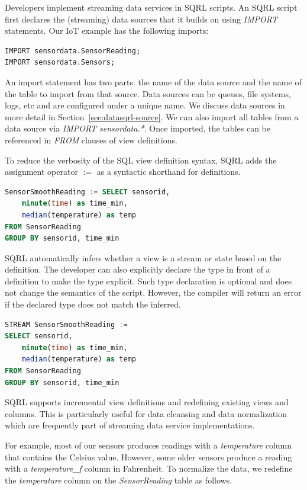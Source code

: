 \documentclass[	DIV=calc,%
							paper=letter,%
							fontsize=11pt,%
							twocolumn]{scrartcl}	 					%
\begin{document}
Developers implement streaming data services in SQRL scripts. An SQRL script first declares the (streaming) data sources that it builds on using \emph{IMPORT} statements. Our IoT example has the following imports:
\begin{lstlisting}[language=SQL]
IMPORT sensordata.SensorReading;
IMPORT sensordata.Sensors;
\end{lstlisting}

An import statement has two parts: the name of the data source and the name of the table to import from that source. Data sources can be queues, file systems, logs, etc and are configured under a unique name. We discuss data sources in more detail in Section~\ref{sec:datasqrl-source}.
We can also import all tables from a data source via \emph{IMPORT sensordata.*}. Once imported, the tables can be referenced in \emph{FROM} clauses of view definitions.

To reduce the verbosity of the SQL view definition syntax, SQRL adds the assignment operator $:=$ as a syntactic shorthand for definitions.

\begin{lstlisting}[language=SQL]
SensorSmoothReading := SELECT sensorid,
    minute(time) as time_min,
    median(temperature) as temp
FROM SensorReading
GROUP BY sensorid, time_min
\end{lstlisting}

SQRL automatically infers whether a view is a stream or state based on the definition. The developer can also explicitly declare the type in front of a definition to make the type explicit. Such type declaration is optional and does not change the semantics of the script. However, the compiler will return an error if the declared type does not match the inferred.

\begin{lstlisting}[language=SQL]
STREAM SensorSmoothReading :=
SELECT sensorid,
    minute(time) as time_min,
    median(temperature) as temp
FROM SensorReading
GROUP BY sensorid, time_min
\end{lstlisting}

SQRL supports incremental view definitions and redefining existing views and columns. This is particularly useful for data cleansing and data normalization which are frequently part of streaming data service implementations.

For example, most of our sensors produces readings with a \emph{temperature} column that contains the Celsius value. However, some older sensors produce a reading with a \emph{temperature\_f} column in Fahrenheit. To normalize the data, we redefine the \emph{temperature} column on the \emph{SensorReading} table as follows.
\end{document}
